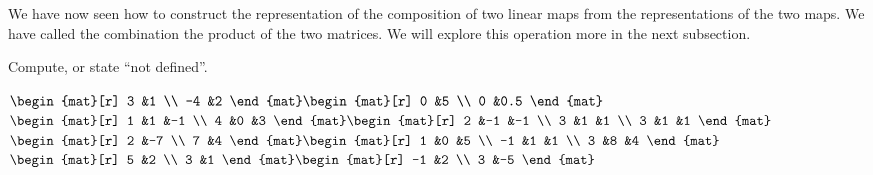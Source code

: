 We have now seen how to construct 
the representation of the composition of two linear maps
from the representations of the two maps.
We have called the combination the product of the two matrices.
We
will explore this operation more in the next subsection.

\begin{exercises}
  \recommended \item 
    Compute, or state ``not defined''.
    \begin{exparts*}
      \partsitem
        $\begin{mat}[r]
          3  &1  \\
          -4 &2 
        \end{mat}
        \begin{mat}[r]
          0  &5  \\
          0  &0.5
        \end{mat}$
      \partsitem \(
        \begin{mat}[r]
          1  &1  &-1  \\
          4  &0  &3
        \end{mat}
        \begin{mat}[r]
          2  &-1 &-1  \\
          3  &1  &1   \\
          3  &1  &1
        \end{mat}   \)
      \partsitem \(
        \begin{mat}[r]
          2  &-7 \\
          7  &4
        \end{mat}
        \begin{mat}[r]
          1  &0  &5   \\
         -1  &1  &1   \\
          3  &8  &4
        \end{mat}   \)
      \partsitem \(
        \begin{mat}[r]
          5  &2  \\
          3  &1
        \end{mat}
        \begin{mat}[r]
          -1  &2   \\
           3  &-5
        \end{mat} \)
    \end{exparts*}
    \begin{answer} 
      \begin{exparts*}
        \partsitem
          $\begin{mat}[r]

\end{mat}
\end{exparts*}
\end{answer}
\end{exercises}

